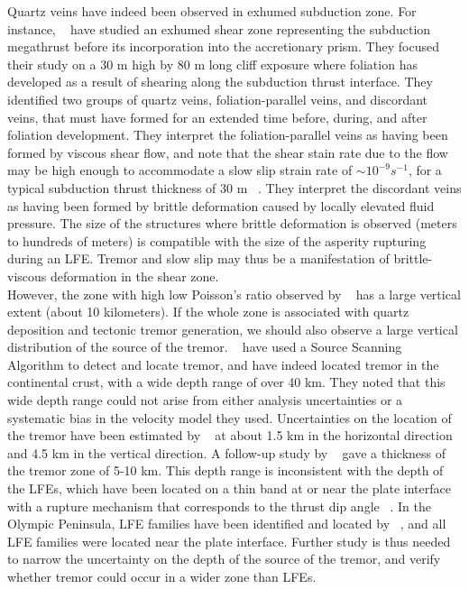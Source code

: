 \documentclass[draft]{agujournal2019}
\begin{document}
Quartz veins have indeed been observed in exhumed subduction zone. For instance, ~ have studied an exhumed shear zone representing the subduction megathrust before its incorporation into the accretionary prism. They focused their study on a 30 m high by 80 m long cliff exposure where foliation has developed as a result of shearing along the subduction thrust interface. They identified two groups of quartz veins, foliation-parallel veins, and discordant veins, that must have formed for an extended time before, during, and after foliation development. They interpret the foliation-parallel veins as having been formed by viscous shear flow, and note that the shear stain rate due to the flow may be high enough to accommodate a slow slip strain rate of $\sim 10^{-9}s^{-1}$, for a typical subduction thrust thickness of 30 m ~\cite{ROW_2013}. They interpret the discordant veins as having been formed by brittle deformation caused by locally elevated fluid pressure. The size of the structures where brittle deformation is observed (meters to hundreds of meters) is compatible with the size of the asperity rupturing during an LFE. Tremor and slow slip may thus be a manifestation of brittle-viscous deformation in the shear zone. \\

However, the zone with high low Poisson's ratio observed by ~ has a large vertical extent (about 10 kilometers). If the whole zone is associated with quartz deposition and tectonic tremor generation, we should also observe a large vertical distribution of the source of the tremor. ~ have used a Source Scanning Algorithm to detect and locate tremor, and have indeed located tremor in the continental crust, with a wide depth range of over 40 km. They noted that this wide depth range could not arise from either analysis uncertainties or a systematic bias in the velocity model they used. Uncertainties on the location of the tremor have been estimated by ~ at about 1.5 km in the horizontal direction and 4.5 km in the vertical direction. A follow-up study by ~ gave a thickness of the tremor zone of 5-10 km. This depth range is inconsistent with the depth of the LFEs, which have been located on a thin band at or near the plate interface with a rupture mechanism that corresponds to the thrust dip angle ~\cite{IDE_2007_GRL}. In the Olympic Peninsula, LFE families have been identified and located by ~, and all LFE families were located near the plate interface. Further study is thus needed to narrow the uncertainty on the depth of the source of the tremor, and verify whether tremor could occur in a wider zone than LFEs. \\
\end{document}
